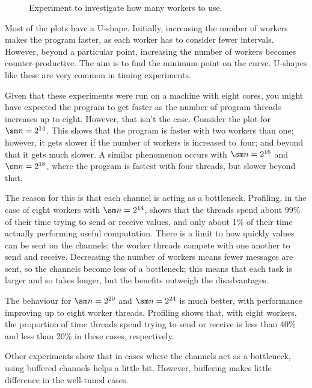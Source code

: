 
\begin{figure}
\begin{center}

\end{center}
\caption{Experiment to investigate how many workers to use.}
\label{fig:trapeziumExperimentLogScale}
\end{figure}


Most of the plots have a U-shape.  Initially, increasing the number of workers
makes the program faster, as each worker has to consider fewer intervals.
However, beyond a particular point, increasing the number of workers becomes
counter-productive.  The aim is to find the minimum point on the curve.
U-shapes like these are very common in timing experiments.

Given that these experiments were run on a machine with eight cores, you might
have expected the program to get faster as the number of program threads
increases up to eight.  However, that isn't the case.  Consider the plot for
$\sm n = 2^{14}$.  This shows that the program is faster with two workers than
one; however, it gets slower if the number of workers is increased to~four;
and beyond that it gets much slower.  A similar phenomenon occurs with $\sm n
= 2^{16}$ and $\sm n = 2^{18}$, where the program is fastest with four
threads, but slower beyond that.  

The reason for this is that each channel is acting as a
bottleneck.  Profiling, in the case of eight workers with
$\sm n = 2^{14}$, shows that the threads spend about 99\% of their time trying
to send or receive values, and only about 1\% of their time actually
performing useful computation.  There is a limit to how quickly values can be
sent on the channels; the worker threads compete with one another to send and
receive.  Decreasing the number of workers means fewer messages are sent, so
the channels become less of a bottleneck; this means that each task is larger
and so takes longer, but the benefits outweigh the disadvantages.

The behaviour for $\sm n = 2^{20}$ and $\sm n = 2^{24}$ is much better, with
performance improving up to eight worker threads.  Profiling shows that, with
eight workers, the proportion of time threads spend trying to send or receive
is less than 40\% and less than 20\% in these cases, respectively.

Other experiments show that in cases where the channels act as a bottleneck, 
using buffered channels helps a little bit.  However, buffering makes little
difference in the well-tuned cases.
 
